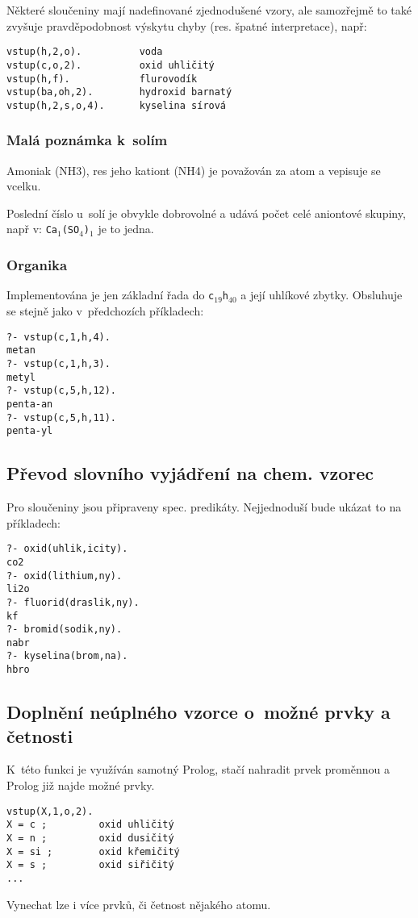 \documentclass[a4paper]{article}
\begin{document}
Některé sloučeniny mají nadefinované zjednodušené vzory, ale samozřejmě to také zvyšuje pravděpodobnost výskytu chyby (res. špatné interpretace), např:
\begin{verbatim}
vstup(h,2,o).          voda
vstup(c,o,2).          oxid uhličitý
vstup(h,f).            flurovodík
vstup(ba,oh,2).        hydroxid barnatý
vstup(h,2,s,o,4).      kyselina sírová
\end{verbatim}
\subsubsection{Malá poznámka k~solím}
Amoniak (NH3), res jeho kationt (NH4) je považován za atom a vepisuje se vcelku.

Poslední číslo u~solí je obvykle dobrovolné a udává počet celé aniontové skupiny, např v: \texttt{Ca$_1$(SO$_4$)$_1$} je to jedna.
\subsubsection{Organika}
Implementována je jen základní řada do \texttt{c$_19$h$_40$} a její uhlíkové zbytky. Obsluhuje se stejně jako v~předchozích příkladech:
\begin{verbatim}
?- vstup(c,1,h,4).
metan
?- vstup(c,1,h,3).
metyl
?- vstup(c,5,h,12).
penta-an
?- vstup(c,5,h,11).
penta-yl
\end{verbatim}
\subsection{Převod slovního vyjádření na chem. vzorec}
Pro sloučeniny jsou připraveny spec. predikáty. Nejjednoduší bude ukázat to na příkladech:
\begin{verbatim}
?- oxid(uhlik,icity).
co2
?- oxid(lithium,ny).
li2o
?- fluorid(draslik,ny).
kf
?- bromid(sodik,ny).
nabr
?- kyselina(brom,na).
hbro
\end{verbatim}


\subsection{Doplnění neúplného vzorce o~možné prvky a četnosti}
K~této funkci je využíván samotný Prolog, stačí nahradit prvek proměnnou a Prolog již najde možné prvky.
\begin{verbatim}
vstup(X,1,o,2).
X = c ;         oxid uhličitý
X = n ;         oxid dusičitý
X = si ;        oxid křemičitý
X = s ;         oxid siřičitý
...
\end{verbatim}
Vynechat lze i více prvků, či četnost nějakého atomu.
\end{document}
